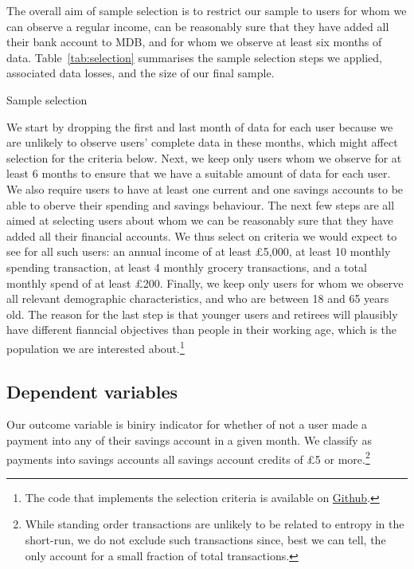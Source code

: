 The overall aim of sample selection is to restrict our sample to users for whom
we can observe a regular income, can be reasonably sure that they have added
all their bank account to MDB, and for whom we observe at least six months of
data. Table~\ref{tab:selection} summarises the sample selection steps we
applied, associated data losses, and the size of our final sample.

\begin{table}[ht]
\centering\footnotesize
\caption{Sample selection}\label{tab:selection}

\end{table}

We start by dropping the first and last month of data for each user because we
are unlikely to observe users' complete data in these months, which might
affect selection for the criteria below. Next, we keep only users whom we
observe for at least 6 months to ensure that we have a suitable amount of data
for each user. We also require users to have at least one current and one
savings accounts to be able to oberve their spending and savings behaviour. The
next few steps are all aimed at selecting users about whom we can be reasonably
sure that they have added all their financial accounts. We thus select on
criteria we would expect to see for all such users: an annual income of at
least \pounds5,000, at least 10 monthly spending transaction, at least 4
monthly grocery transactions, and a total monthly spend of at least \pounds200.
Finally, we keep only users for whom we observe all relevant demographic
characteristics, and who are between 18 and 65 years old. The reason for the
last step is that younger users and retirees will plausibly have different
fianncial objectives than people in their working age, which is the population
we are interested about.\footnote{The code that implements the selection
criteria is available on
\href{https://github.com/fabiangunzinger/entropy/blob/c49c9c34c96d073725afd3a1494458a388d00051/src/data/selectors.py}{Github}.}


\subsection{Dependent variables}
\label{sub:dependent_variables}

Our outcome variable is biniry indicator for whether of not a user made a
payment into any of their savings account in a given month. We classify as
payments into savings accounts all savings account credits of \pounds5 or
more.\footnote{While standing order transactions are unlikely to be related to
entropy in the short-run, we do not exclude such transactions since, best we
can tell, the only account for a small fraction of total transactions.}

